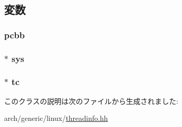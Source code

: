 \subsection{変数}
\hypertarget{classLinux_1_1ThreadInfo_a6e10da530c8ba76b721d983185b1ea8d}{
\subsubsection[{pcbb}]{ pcbb}}
\label{classLinux_1_1ThreadInfo_a6e10da530c8ba76b721d983185b1ea8d}
\hypertarget{classLinux_1_1ThreadInfo_a8ae37465ba84acfef6af3e9b9e6dbbd5}{
\subsubsection[{sys}]{$\ast$ sys}}
\label{classLinux_1_1ThreadInfo_a8ae37465ba84acfef6af3e9b9e6dbbd5}
\hypertarget{classLinux_1_1ThreadInfo_a4455a4759e69e5ebe68ae7298cbcc37d}{
\subsubsection[{tc}]{$\ast$ tc}}
\label{classLinux_1_1ThreadInfo_a4455a4759e69e5ebe68ae7298cbcc37d}


このクラスの説明は次のファイルから生成されました:\begin{DoxyCompactItemize}
\item 
arch/generic/linux/\hyperlink{threadinfo_8hh}{threadinfo.hh}\end{DoxyCompactItemize}
